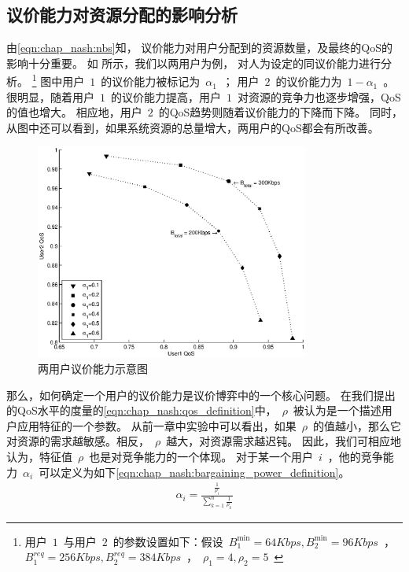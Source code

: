\subsection{议价能力对资源分配的影响分析}
由\eqref{eqn:chap_nash:nbs}知，
议价能力对用户分配到的资源数量，及最终的QoS的影响十分重要。
如 所示，我们以两用户为例，
对人为设定的同议价能力进行分析。
\footnote{用户~$1$~与用户~$2$~的参数设置如下：假设~$B_1^{\min}=64Kbps, B_2^{\min}=96Kbps$~，~$B_1^{req}=256Kbps, B_2^{req}=384Kbps$~，~$\rho_1=4, \rho_2=5$~}
图中用户~$1$~的议价能力被标记为~$\alpha_1$~；
用户~$2$~的议价能力为~$1-\alpha_1$~。
很明显，随着用户~$1$~的议价能力提高，用户~$1$~对资源的竞争力也逐步增强，QoS的值也增大。
相应地，用户~$2$~的QoS趋势则随着议价能力的下降而下降。
同时，从图中还可以看到，如果系统资源的总量增大，两用户的QoS都会有所改善。
\begin{figure}[!tb] 
    \centering 
    \includegraphics[width = 9cm]{chap_nash_two_users_nbs_qos.eps} 
    \caption{两用户议价能力示意图}
    \label{fig:chap_nash:two_users_nbs_qos} 
\end{figure}
那么，如何确定一个用户的议价能力是议价博弈中的一个核心问题。
在我们提出的QoS水平的度量的\eqref{eqn:chap_nash:qos_definition}中，~$\rho$~被认为是一个描述用户应用特征的一个参数。
从前一章中实验中可以看出，如果~$\rho$~的值越小，那么它对资源的需求越敏感。相反，~$\rho$~越大，对资源需求越迟钝。
因此，我们可相应地认为，特征值~$\rho$~也是对竞争能力的一个体现。
对于某一个用户~$i$~，他的竞争能力~$\alpha_i$~可以定义为如下\eqref{eqn:chap_nash:bargaining_power_definition}。
\begin{align}
    \alpha_i = \frac{\frac{1}{\rho_i}}{\sum_{k=1}^n \frac{1}{\rho_k} }
    \label{eqn:chap_nash:bargaining_power_definition}
\end{align}

